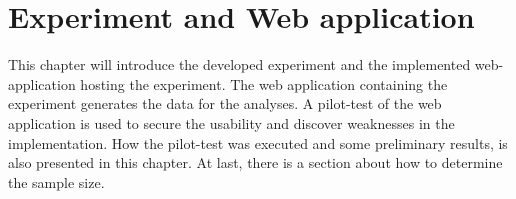 \chapter{Experiment and Web application}
This chapter will introduce the developed experiment and the implemented web-application hosting the experiment. The web application containing the experiment generates the data for the analyses. A pilot-test of the web application is used to secure the usability and discover weaknesses in the implementation. How the pilot-test was executed and some preliminary results, is also presented in this chapter. At last, there is a section about how to determine the sample size.  


